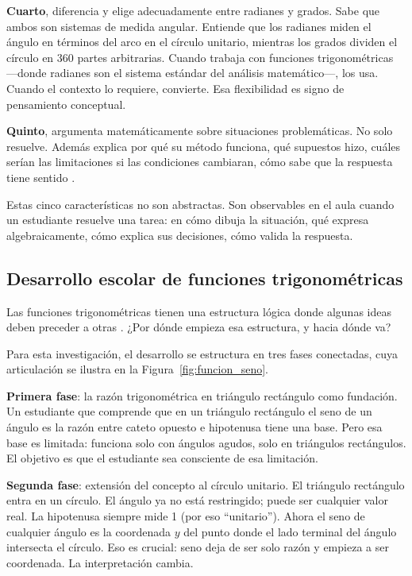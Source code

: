 \textbf{Cuarto}, diferencia y elige adecuadamente entre radianes y grados. Sabe que ambos son sistemas de medida angular. Entiende que los radianes miden el ángulo en términos del arco en el círculo unitario, mientras los grados dividen el círculo en 360 partes arbitrarias. Cuando trabaja con funciones trigonométricas —donde radianes son el sistema estándar del análisis matemático—, los usa. Cuando el contexto lo requiere, convierte. Esa flexibilidad es signo de pensamiento conceptual.

\textbf{Quinto}, argumenta matemáticamente sobre situaciones problemáticas. No solo resuelve. Además explica por qué su método funciona, qué supuestos hizo, cuáles serían las limitaciones si las condiciones cambiaran, cómo sabe que la respuesta tiene sentido \parencite{montiel-espinosaDesarrolloPensamientoTrigonometrico2013}.

Estas cinco características no son abstractas. Son observables en el aula cuando un estudiante resuelve una tarea: en cómo dibuja la situación, qué expresa algebraicamente, cómo explica sus decisiones, cómo valida la respuesta.

\subsection{Desarrollo escolar de funciones trigonométricas}

Las funciones trigonométricas tienen una estructura lógica donde algunas ideas deben preceder a otras \parencite{hsuReviewMathematicalTasks2023}. ¿Por dónde empieza esa estructura, y hacia dónde va?

Para esta investigación, el desarrollo se estructura en tres fases conectadas, cuya articulación se ilustra en la Figura~\ref{fig:funcion_seno}.

\textbf{Primera fase}: la razón trigonométrica en triángulo rectángulo como fundación. Un estudiante que comprende que en un triángulo rectángulo el seno de un ángulo es la razón entre cateto opuesto e hipotenusa tiene una base. Pero esa base es limitada: funciona solo con ángulos agudos, solo en triángulos rectángulos. El objetivo es que el estudiante sea consciente de esa limitación.

\textbf{Segunda fase}: extensión del concepto al círculo unitario. El triángulo rectángulo entra en un círculo. El ángulo ya no está restringido; puede ser cualquier valor real. La hipotenusa siempre mide 1 (por eso ``unitario''). Ahora el seno de cualquier ángulo es la coordenada $y$ del punto donde el lado terminal del ángulo intersecta el círculo. Eso es crucial: seno deja de ser solo razón y empieza a ser coordenada. La interpretación cambia.

